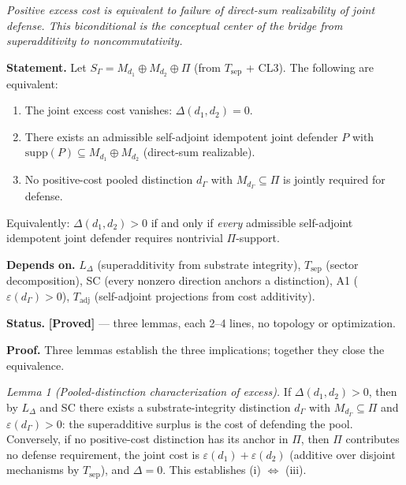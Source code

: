 \documentclass[11pt]{article}
\theoremstyle{remark}
\begin{document}
\begin{tcolorbox}[apfbox, title={Theorem $L_{\mathrm{blk}}$ --- Excess Cost and Direct-Sum Realizability}]
\label{lem:L_blk}

\textit{Positive excess cost is equivalent to failure of direct-sum realizability of joint defense.  This biconditional is the conceptual center of the bridge from superadditivity to noncommutativity.}

\smallskip\noindent\textbf{Statement.}  Let $S_\Gamma = M_{d_1} \oplus M_{d_2} \oplus \Pi$ (from $T_{\mathrm{sep}}$ + CL3).  The following are equivalent:
\begin{enumerate}[nosep,leftmargin=2em,itemsep=2pt,label=(\roman*)]
\item The joint excess cost vanishes: $\Delta(d_1,d_2) = 0$.
\item There exists an admissible self-adjoint idempotent joint defender $P$ with $\mathrm{supp}(P) \subseteq M_{d_1} \oplus M_{d_2}$ (direct-sum realizable).
\item No positive-cost pooled distinction $d_\Gamma$ with $M_{d_\Gamma} \subseteq \Pi$ is jointly required for defense.
\end{enumerate}
Equivalently: $\Delta(d_1, d_2) > 0$ if and only if \emph{every} admissible self-adjoint idempotent joint defender requires nontrivial $\Pi$-support.

\smallskip\noindent\textbf{Depends on.}  $L_\Delta$ (superadditivity from substrate integrity), $T_{\mathrm{sep}}$ (sector decomposition), SC (every nonzero direction anchors a distinction), A1 ($\varepsilon(d_\Gamma) > 0$), $T_{\mathrm{adj}}$ (self-adjoint projections from cost additivity).

\smallskip\noindent\textbf{Status.}  \textbf{[Proved]} --- three lemmas, each 2--4 lines, no topology or optimization.

\smallskip\noindent\textbf{Proof.}  Three lemmas establish the three implications; together they close the equivalence.

\medskip\noindent\textit{Lemma 1 (Pooled-distinction characterization of excess).}
If $\Delta(d_1,d_2) > 0$, then by $L_\Delta$ and SC there exists a substrate-integrity distinction $d_\Gamma$ with $M_{d_\Gamma} \subseteq \Pi$ and $\varepsilon(d_\Gamma) > 0$: the superadditive surplus is the cost of defending the pool.  Conversely, if no positive-cost distinction has its anchor in $\Pi$, then $\Pi$ contributes no defense requirement, the joint cost is $\varepsilon(d_1) + \varepsilon(d_2)$ (additive over disjoint mechanisms by $T_{\mathrm{sep}}$), and $\Delta = 0$.  This establishes (i) $\Leftrightarrow$ (iii).


\end{tcolorbox}
\end{document}
